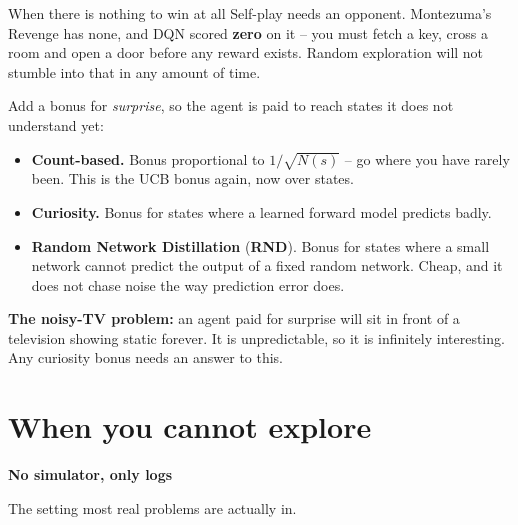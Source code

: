\documentclass[aspectratio=169]{beamer}
\begin{document}
\begin{frame}{When there is nothing to win at all}
  \small
  Self-play needs an opponent. Montezuma's Revenge has none, and DQN scored \textbf{zero} on it
  -- you must fetch a key, cross a room and open a door before any reward exists. Random
  exploration will not stumble into that in any amount of time.

  \vskip 8pt
  \begin{tcolorbox}[colback=armblue!8, colframe=armblue, boxrule=0.7pt, arc=2pt,
                    title={\textbf{Intrinsic motivation: invent your own reward}}]
    \small
    Add a bonus for \emph{surprise}, so the agent is paid to reach states it does not understand
    yet:

    \vskip 4pt
    \begin{itemize}\itemsep2pt
      \item \textbf{Count-based.} Bonus proportional to $1/\sqrt{N(s)}$ -- go where you have
            rarely been. This is the UCB bonus again, now over states.
      \item \textbf{Curiosity.} Bonus for states where a learned forward model predicts badly.
      \item \textbf{Random Network Distillation} (\textbf{RND}). Bonus for states where a small
            network cannot predict the output of a fixed random network. Cheap, and it does not
            chase noise the way prediction error does.
    \end{itemize}
  \end{tcolorbox}

  \vskip 6pt
  \begin{tcolorbox}[colback=armred!8, colframe=armred, boxrule=0.6pt, arc=2pt]
    \small
    \textbf{The noisy-TV problem:} an agent paid for surprise will sit in front of a television
    showing static forever. It is unpredictable, so it is infinitely interesting. Any
    curiosity bonus needs an answer to this.
  \end{tcolorbox}
\end{frame}

\section{When you cannot explore}
\begin{frame}[plain]
  \begin{center}
    \vskip 1.6cm
    {\Huge\bfseries\color{popblue}No simulator, only logs}

    \vskip 0.6cm
    {\large The setting most real problems are actually in.}
  \end{center}
\end{frame}
\end{document}
